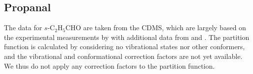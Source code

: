 \documentclass[twocolumn, twocolappendix, astrosymb, times]{aastex631}
\newcommand{\propanal}{$s$-C$_2$H$_5$CHO\xspace}
\begin{document}
\subsection{Propanal}
The data for \propanal are taken from the CDMS, which are largely based on the experimental measurements by \citet{Zingsheim2017} with additional data from \citet{Hardy1982} and \citet{Demaison1987}. The partition function is calculated by considering no vibrational states nor other conformers, and the vibrational and conformational correction factors are not yet available. We thus do not apply any correction factors to the partition function.









{}



\end{document}
